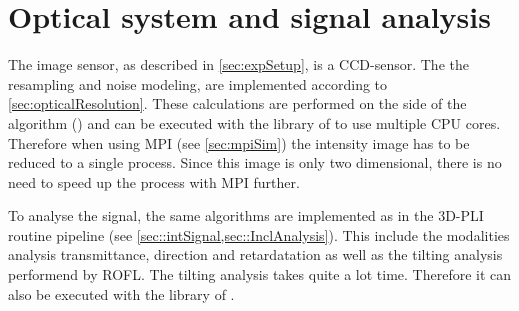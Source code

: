 \section{Optical system and signal analysis}
\label{sec:ccdOptic}
%
The image sensor, as described in \cref{sec:expSetup}, is a \ac{CCD}-sensor.
The the resampling and noise modeling, are implemented according to \cref{sec:opticalResolution}.
These calculations are performed on the \python{} side of the algorithm () and can be executed with the  library of \python{} to use multiple \ac{CPU} cores.
Therefore when using \ac{MPI} (see \cref{sec:mpiSim}) the intensity image has to be reduced to a single process.
Since this image is only two dimensional, there is no need to speed up the process with \ac{MPI} further.
\par
%
To analyse the signal, the same algorithms are implemented as in the \ac{3D-PLI} routine pipeline (see \cref{sec::intSignal,sec::InclAnalysis}).
This include the modalities analysis transmittance, direction and retardatation as well as the tilting analysis performend by \ac{ROFL}.
The tilting analysis takes quite a lot time.
Therefore it can also be executed with the  library of \python{}.
%
%
%
